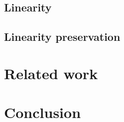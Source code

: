 \documentclass{mproj}
\begin{document}
\section{Linearity}\label{linearity}

\section{Linearity preservation}\label{linearity-preservation}

\chapter{Related work}\label{related-work}

\chapter{Conclusion}\label{conclusion}



\end{document}
